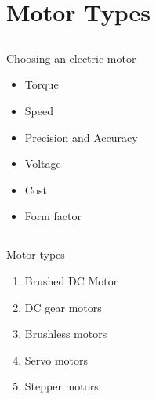 \section{Motor Types}


\subsection{}
{
\begin{frame}{Choosing an electric motor}

\begin{itemize}
\item Torque
\item Speed
\item Precision and Accuracy
\item Voltage
\item Cost
\item Form factor
\end{itemize}

\end{frame}
}


\subsection{}
{
\begin{frame}{Motor types}

\begin{enumerate}
\item Brushed DC Motor
\item DC gear motors
\item Brushless motors
\item Servo motors
\item Stepper motors 
\end{enumerate}

\end{frame}
}



